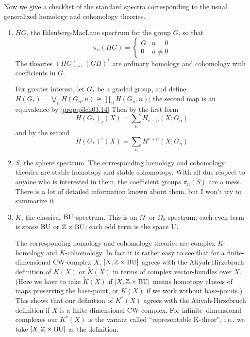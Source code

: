 \documentclass[../main]{subfiles}
\begin{document}
Now we give a checklist of the standard spectra corresponding to the usual generalized homology and cohomology theories.
\begin{enumerate}[label = (\roman*)]
    \item $HG$, the Eilenberg-MacLane spectrum for the group $G$, so that
    \[\pi_n(HG) = 
    \begin{cases}
    G &n=0 \\
    0 &n\neq 0
    \end{cases}\]
    The theories $(HG)_\ast$, $(GH)^\ast$ are ordinary homology and cohomology with coefficients in $G$.
    
    For greater interest, let $G_\ast$ be a graded group, and define \newline $H(G_\ast)=\bigvee_n H(G_n, n)\cong \prod_n H(G_n, n)$; the second map is an equivalence by \ref{prop:p3ch03.14} Then by the first form
    \[H(G_\ast)_r(X)=\sum_n H_{r-n}(X;G_n)\]
    and by the second
    \[H(G_\ast)^r(X)=\sum_n H^{r+n}(X;G_n)\]
    \item $S$, the sphere spectrum. The corresponding homology and cohomology theories are stable homotopy and stable cohomotopy. With all due respect to anyone who is interested in them, the coefficient groups $\pi_n(S)$ are a mess. There is a lot of detailed information known about them, but I won't try to summarize it.
    \item $K$, the classical $\mathrm{BU}$-spectrum. This is an $\Omega$- or $\Omega_0$-spectrum; each even term is space $\mathrm{BU}$ or $\mathbb{Z}\times \mathrm{BU}$; each odd term is the space $\mathrm{U}$.
    
    The corresponding homology and cohomology theories are complex $K$-homology and $K$-cohomology. In fact it is rather easy to see that for a finite-dimensional CW-complex $X$, $[X, \mathbb{Z}\times \mathrm{BU}]$ agrees with the Atiyah-Hirzebruch definition of $K(X)$ or $\widetilde{K}(X)$ in terms of complex vector-bundles over $X$. (Here we have to take $\widetilde{K}(X)$ if $[X, \mathbb{Z}\times \mathrm{BU}]$ means homotopy classes of maps preserving the base-point, or $K(X)$ if we work without base-points.) This shows that our definition of $K^\ast(X)$ agrees with the Atiyah-Hirzebruch definition if $X$ is a finite-dimensional CW-complex. For infinite~dimensional complexes our $K^\ast(X)$ is the variant called ``representable K-theor'', i.e., we take $[X,\mathbb{Z}\times \mathrm{BU}]$ as the definition. 
    

\end{enumerate}
\end{document}
